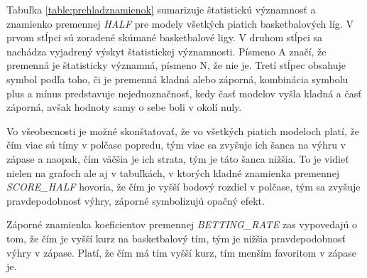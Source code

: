 \documentclass[
  digital, %
  twoside, %
  notable,   %
  lof,     %
  lot,     %
]{fithesis3}
\begin{document}
	Tabuľka \ref{table:prehladznamienok} sumarizuje štatistickú významnosť a znamienko premennej \textit{HALF} pre modely všetkých piatich basketbalových líg. V prvom stĺpci sú zoradené skúmané basketbalové ligy. V druhom stĺpci sa nachádza vyjadrený výskyt štatistickej významnosti. Písmeno A značí, že premenná je štatisticky významná, písmeno N, že nie je. Tretí stĺpec obsahuje symbol podľa toho, či je premenná kladná alebo záporná, kombinácia symbolu plus a mínus predstavuje nejednoznačnosť, kedy časť modelov vyšla kladná a časť záporná, avšak hodnoty samy o sebe boli v okolí nuly.
	
	Vo všeobecnosti je možné skonštatovať, že vo všetkých piatich modeloch platí, že čím viac sú tímy v polčase popredu, tým viac sa zvyšuje ich šanca na výhru v zápase a naopak, čím väčšia je ich strata, tým je táto šanca nižšia. To je vidieť nielen na grafoch ale aj v tabuľkách, v ktorých kladné znamienka premennej \textit{SCORE\_HALF} hovoria, že čím je vyšší bodový rozdiel v polčase, tým sa zvyšuje pravdepodobnosť výhry, záporné symbolizujú opačný efekt.
	
	Záporné znamienka koeficientov premennej \textit{BETTING\_RATE} zas vypovedajú o tom, že čím je vyšší kurz na basketbalový tím, tým je nižšia pravdepodobnosť výhry v zápase. Platí, že čím má tím vyšší kurz, tím menším favoritom v zápase je.
	
\end{document}

